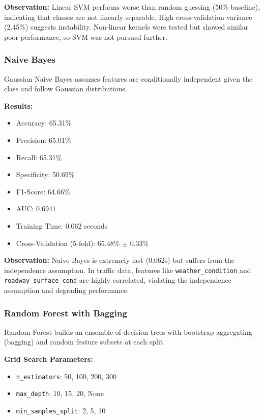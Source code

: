 \documentclass[12pt,man]{apa7}
\begin{document}
\textbf{Observation:} Linear SVM performs worse than random guessing (50\% baseline), indicating that classes are not linearly separable. High cross-validation variance (2.45\%) suggests instability. Non-linear kernels were tested but showed similar poor performance, so SVM was not pursued further.

\subsubsection{Naive Bayes}

Gaussian Naive Bayes assumes features are conditionally independent given the class and follow Gaussian distributions.

\textbf{Results:}
\begin{itemize}
    \item Accuracy: 65.31\%
    \item Precision: 65.01\%
    \item Recall: 65.31\%
    \item Specificity: 50.69\%
    \item F1-Score: 64.66\%
    \item AUC: 0.6941
    \item Training Time: 0.062 seconds
    \item Cross-Validation (5-fold): 65.48\% $\pm$ 0.33\%
\end{itemize}

\textbf{Observation:} Naive Bayes is extremely fast (0.062s) but suffers from the independence assumption. In traffic data, features like \texttt{weather\_condition} and \texttt{roadway\_surface\_cond} are highly correlated, violating the independence assumption and degrading performance.

\subsubsection{Random Forest with Bagging}

Random Forest builds an ensemble of decision trees with bootstrap aggregating (bagging) and random feature subsets at each split.

\textbf{Grid Search Parameters:}
\begin{itemize}
    \item \texttt{n\_estimators}: 50, 100, 200, 300
    \item \texttt{max\_depth}: 10, 15, 20, None
    \item \texttt{min\_samples\_split}: 2, 5, 10
\end{itemize}
\end{document}

